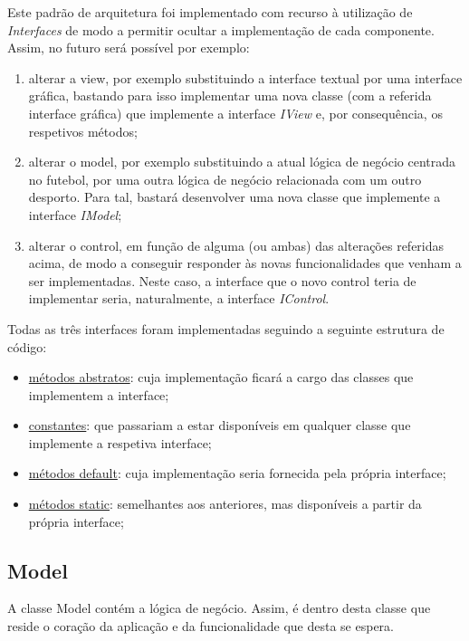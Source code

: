 \documentclass[11pt]{article}
\begin{document}
Este padrão de arquitetura foi implementado com recurso à utilização de \textit{Interfaces} de modo a permitir ocultar a implementação de cada componente. Assim, no futuro será possível por exemplo:

\begin{enumerate}

\item alterar a view, por exemplo substituindo a interface textual por uma interface gráfica, bastando para isso implementar uma nova classe (com a referida interface gráfica) que implemente a interface \textit{IView} e, por consequência, os respetivos métodos;

\item alterar o model, por exemplo substituindo a atual lógica de negócio centrada no futebol, por uma outra lógica de negócio relacionada com um outro desporto. Para tal, bastará desenvolver uma nova classe que implemente a interface \textit{IModel};

\item alterar o control, em função de alguma (ou ambas) das alterações referidas acima, de modo a conseguir responder às novas funcionalidades que venham a ser implementadas. Neste caso, a interface que o novo control teria de implementar seria, naturalmente, a interface \textit{IControl}.

\end{enumerate}

Todas as três interfaces foram implementadas seguindo a seguinte estrutura de código:

\begin{itemize}

\item \underline{métodos abstratos}: cuja implementação ficará a cargo das classes que implementem a interface;

\item \underline{constantes}: que passariam a estar disponíveis em qualquer classe que implemente a respetiva interface;

\item \underline{métodos default}: cuja implementação seria fornecida pela própria interface;

\item \underline{métodos static}: semelhantes aos anteriores, mas disponíveis a partir da própria interface;

\end{itemize}

\subsection{Model}
A classe Model contém a lógica de negócio. Assim, é dentro desta classe que reside o coração da aplicação e da funcionalidade que desta se espera.
\end{document}
